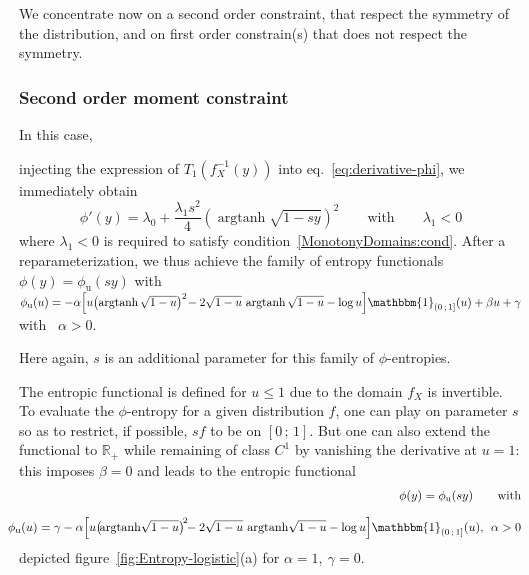 \documentclass[entropy,article,submit,moreauthors,pdftex]{Definitions/mdpi}
\newcommand{\SZ}[1]{{\color{blue} #1}}                                       %
\newcommand{\Avoir}[1]{{\color{red}\bf #1}}                                  %
\def\Rset{\mathbb{R}}%
\def\un{\mathbbm{1}}%
\def\argtanh{\operatorname{argtanh}}%
\def\u{\mathrm{u}}
\begin{document}
We concentrate  now on a second  order constraint, that respect  the symmetry of
the distribution,  and on  first order  constrain(s) that  does not  respect the
symmetry.



\subsubsection{Second order moment constraint}
\label{subsubsecapp:LogisticSecondOrder}

In this  case, \SZ{injecting the  expression of $T_1\left(  f_X^{-1}(y) \right)$
  into   eq.~\eqref{eq:derivative-phi},   we   immediately   obtain
%
\[
\phi'(y) = \lambda_0 + \frac{\lambda_1 s^2}{4} \left( \argtanh\sqrt{1 - s y} \right)^2
\qquad \mbox{with} \qquad \lambda_1 < 0
\]
%
where      $\lambda_1      <      0$       is      required      to      satisfy
condition~\ref{MonotonyDomains:cond}.   After   a  reparameterization,   we  thus
achieve  the  family  of  entropy  functionals $\phi(y)  =  \phi_\u(s  y)$  with
$\phi_\u(u)  = -\alpha  \left[ u  \left(  \argtanh\sqrt{1-u} \right)^2  \!  -  2
  \sqrt{1-u} \,  \argtanh\sqrt{1-u} -  \log u  \right] \un_{\left( 0  \, ;  \, 1
  \right]}(u) + \beta u + \gamma$ with \ $\alpha > 0$.

Here again, $s$ is an additional parameter for this family of $\phi$-entropies.

The entropic  functional is defined  for $u  \le 1$ due  to the domain  $f_X$ is
invertible. To evaluate the $\phi$-entropy for a given distribution $f$, one can
play on parameter $s$ so as to restrict, if possible, $s f$ to be on $[0 \, ; \,
  1]$. But  one can also extend  the functional to $\Rset_+$  while remaining of
class $C^1$ by vanishing the derivative at $u = 1$: this imposes $\beta = 0$ and
leads to the entropic functional
%
\begin{eqnarray*}
  &&\hspace{-7mm}\phi(y) = \phi_\u(s y) \qquad \mbox{with}
 \\[2.5mm]  
&&\hspace{-7mm}\phi_\u(u)  =  \gamma - \alpha \left[  u  \left( \! \argtanh\!\sqrt{1-u} \right)^{\! 2} \!\!  -  2
  \sqrt{1-u}  \, \argtanh\!\sqrt{1-u} -  \log  u  \right] \un_{\left(  0  \,  ; \,  1
  \right]}(u), \:\: \alpha > 0
\end{eqnarray*}
%
depicted figure~\ref{fig:Entropy-logistic}(a) for $\alpha = 1, \: \gamma = 0$.
}

\end{document}
